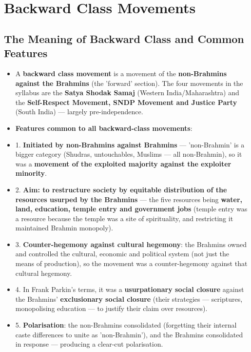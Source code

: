 \chapter{Backward Class Movements}

\section{The Meaning of Backward Class and Common Features}

\begin{KeyConcept}
\begin{itemize}
\item A \textbf{backward class movement} is a movement of the \textbf{non-Brahmins against the Brahmins} (the 'forward' section). The four movements in the syllabus are the \textbf{Satya Shodak Samaj} (Western India/Maharashtra) and the \textbf{Self-Respect Movement, SNDP Movement and Justice Party} (South India) --- largely pre-independence.
\item \textbf{Features common to all backward-class movements}:
\item 1. \textbf{Initiated by non-Brahmins against Brahmins} --- 'non-Brahmin' is a bigger category (Shudras, untouchables, Muslims --- all non-Brahmin), so it was a \textbf{movement of the exploited majority against the exploiter minority}.
\item 2. \textbf{Aim: to restructure society by equitable distribution of the resources usurped by the Brahmins} --- the five resources being \textbf{water, land, education, temple entry and government jobs} (temple entry was a resource because the temple was a site of spirituality, and restricting it maintained Brahmin monopoly).
\item 3. \textbf{Counter-hegemony against cultural hegemony}: the Brahmins owned and controlled the cultural, economic and political system (not just the means of production), so the movement was a counter-hegemony against that cultural hegemony.
\item 4. In Frank Parkin's terms, it was a \textbf{usurpationary social closure} against the Brahmins' \textbf{exclusionary social closure} (their strategies --- scriptures, monopolising education --- to justify their claim over resources).
\item 5. \textbf{Polarisation}: the non-Brahmins consolidated (forgetting their internal caste differences to unite as 'non-Brahmin'), and the Brahmins consolidated in response --- producing a clear-cut polarisation.
\end{itemize}
\end{KeyConcept}

